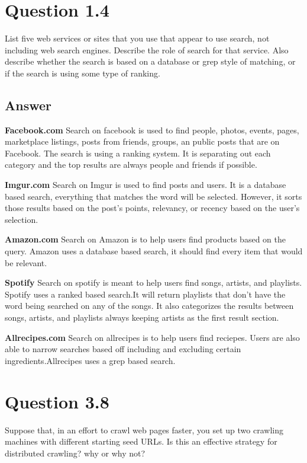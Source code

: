 \documentclass{article}
\begin{document}
\section{Question 1.4}
List five web services or sites that you use that appear to use search, not including web search engines. Describe the role of search for that service. Also describe whether the search is based on a database or grep style of matching, or if the search is using some type of ranking. 

\subsection*{Answer}

\indent
\textbf{Facebook.com}	Search on facebook is used to find people, photos, events, pages, marketplace listings, posts from friends, groups, an public posts that are on Facebook. 
 The search is using a ranking system. It is separating out each category and the top results are always people and friends if possible.
\par
\textbf{Imgur.com} 	Search on Imgur is used to find posts and users. It is a database based search, everything that matches the word will be selected. 
However, it sorts those results based on the post's points, relevancy, or recency based on the user's selection.
\par
\textbf{Amazon.com}		Search on Amazon is to help users find products based on the query. Amazon uses a database based search, it should find every item that would be relevant. 
\par
\textbf{Spotify}	Search on spotify is meant to help users find songs, artists, and playlists. Spotify uses a ranked based search.It will return playlists that don't have the word being searched on any of the songs. It also categorizes the results between songs, artists, and playlists always keeping artists as the first result section.
\par
\textbf{Allrecipes.com}	Search on allrecipes is to help users find reciepes. Users are also able to narrow searches based off including and excluding certain ingredients.Allrecipes uses a grep based search.


\section{Question 3.8}


Suppose that, in an effort to crawl web pages faster, you set up two crawling machines with different starting seed URLs. Is this an effective strategy for distributed crawling? why or why not?
\end{document}
